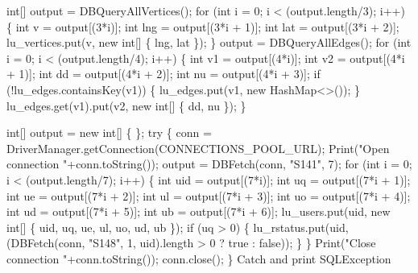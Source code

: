 \documentclass{article}
\def\nwendcode{\endtrivlist \endgroup}      %
\let\nwdocspar=\par
\theoremstyle{definition}                   %
\begin{document}
int[] output = DBQueryAllVertices();
for (int i = 0; i < (output.length/3); i++) \{
  int v = output[(3*i)];
  int lng = output[(3*i + 1)];
  int lat = output[(3*i + 2)];
  lu_vertices.put(v, new int[] \{ lng, lat \});
\}
output = DBQueryAllEdges();
for (int i = 0; i < (output.length/4); i++) \{
  int v1 = output[(4*i)];
  int v2 = output[(4*i + 1)];
  int dd = output[(4*i + 2)];
  int nu = output[(4*i + 3)];
  if (!lu_edges.containsKey(v1)) \{
    lu_edges.put(v1, new HashMap<>());
  \}
  lu_edges.get(v1).put(v2, new int[] \{ dd, nu \});
\}
\nwendcode{}\nwdocspar
\nwenddocs{}\endmoddef{}
int[] output = new int[] \{ \};
try \{
  conn = DriverManager.getConnection(CONNECTIONS_POOL_URL);
  Print("Open connection "+conn.toString());
  output = DBFetch(conn, "S141", 7);
  for (int i = 0; i < (output.length/7); i++) \{
    int uid = output[(7*i)];
    int uq = output[(7*i + 1)];
    int ue = output[(7*i + 2)];
    int ul = output[(7*i + 3)];
    int uo = output[(7*i + 4)];
    int ud = output[(7*i + 5)];
    int ub = output[(7*i + 6)];
    lu_users.put(uid, new int[] \{ uid, uq, ue, ul, uo, ud, ub \});
    if (uq > 0) \{
      lu_rstatus.put(uid, (DBFetch(conn, "S148", 1, uid).length > 0 ? true : false));
    \}
  \}
  Print("Close connection "+conn.toString());
  conn.close();
\}
\LA{}Catch and print \code{}SQLException\edoc{}~{\nwtagstyle{}}\RA{}
\nwendcode{}\nwdocspar
\end{document}
